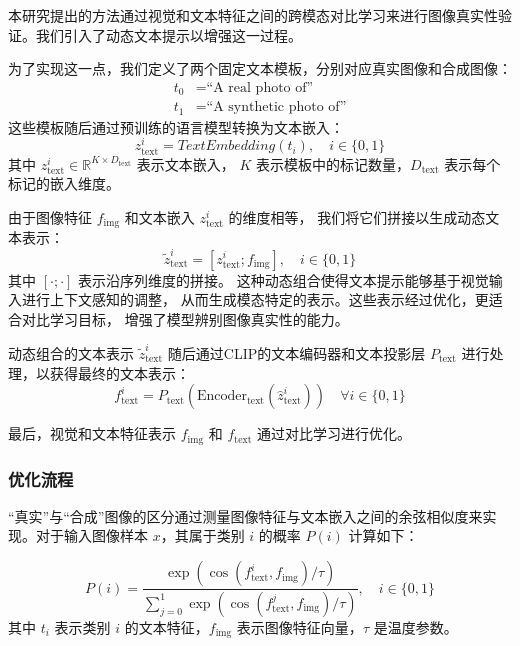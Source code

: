 本研究提出的方法通过视觉和文本特征之间的跨模态对比学习来进行图像真实性验证。我们引入了动态文本提示以增强这一过程。

为了实现这一点，我们定义了两个固定文本模板，分别对应真实图像和合成图像：
\begin{align}
    t_0 &= \text{``A real photo of''} \\
    t_1 &= \text{``A synthetic photo of''}
\end{align}
这些模板随后通过预训练的语言模型转换为文本嵌入：
\begin{equation}
    z_{\text{text}}^i = TextEmbedding(t_i), \quad i \in \{0, 1\}
\end{equation}
其中 $ z_{\text{text}}^i \in \mathbb{R}^{K \times D_{\text{text}}} $ 表示文本嵌入，
$ K $ 表示模板中的标记数量，$ D_{\text{text}} $ 表示每个标记的嵌入维度。

由于图像特征 $ f_{\text{img}} $ 和文本嵌入 $ z_{\text{text}}^i $ 的维度相等，
我们将它们拼接以生成动态文本表示：
\begin{equation}
\widetilde{z}_{\text{text}}^{i} = [z_{\text{text}}^i; f_{\text{img}}], \quad  i \in \{0,1\}
\end{equation}
其中 $[\cdot;\cdot]$ 表示沿序列维度的拼接。
这种动态组合使得文本提示能够基于视觉输入进行上下文感知的调整，
从而生成模态特定的表示。这些表示经过优化，更适合对比学习目标，
增强了模型辨别图像真实性的能力。

动态组合的文本表示 $ \widetilde{z}_{\text{text}}^{i} $ 随后通过CLIP的文本编码器和文本投影层 $ P_{\text{text}} $ 进行处理，以获得最终的文本表示：
\begin{equation}
f_{\text{text}}^i = P_{\text{text}}\left(\text{Encoder}_\text{text}(\widehat{z}_{\text{text}}^{i})\right) \quad \forall i \in \{0,1\}
\end{equation}

最后，视觉和文本特征表示 $ f_{\text{img}} $ 和 $ f_{\text{text}} $ 通过对比学习进行优化。


\subsubsection{优化流程}
\label{sec:lora}

“真实”与“合成”图像的区分通过测量图像特征与文本嵌入之间的余弦相似度来实现。对于输入图像样本 $ x $，其属于类别 $ i $ 的概率 $ P(i) $ 计算如下：

\begin{equation}
P(i) = \frac{\exp\left(\cos(f_{\text{text}}^i, f_{\text{img}})/\tau\right)}{\sum_{j=0}^1 \exp\left(\cos(f_{\text{text}}^j, f_{\text{img}})/\tau\right)},\quad i \in \{0,1\}
\label{eq:probability}
\end{equation}
其中 $ t_i $ 表示类别 $ i $ 的文本特征，$ f_\text{img} $ 表示图像特征向量，$ \tau $ 是温度参数。

